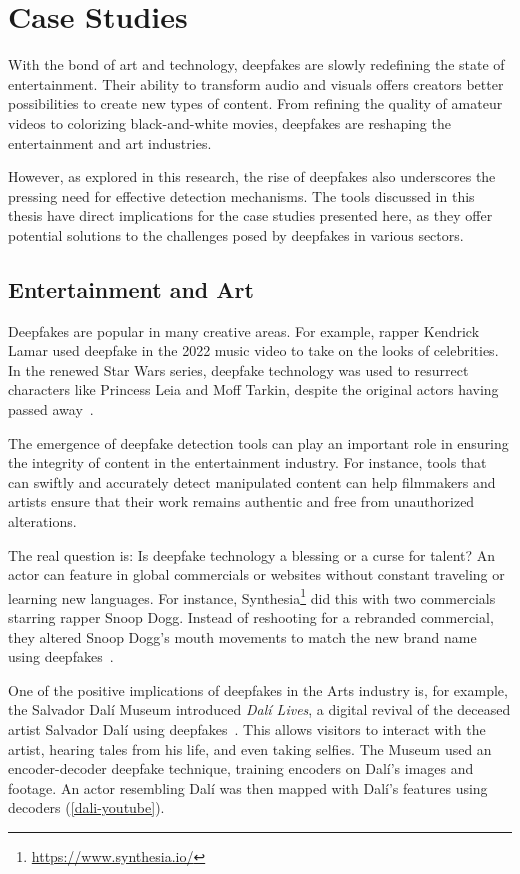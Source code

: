 
\chapter{Case Studies}\label{chapter:applications}
With the bond of art and technology, deepfakes are slowly redefining the state of
entertainment. Their ability to transform audio and visuals offers creators better
possibilities to create new types of content. From refining the quality of amateur
videos to colorizing black-and-white movies, deepfakes are reshaping the entertainment
and art industries.

However, as explored in this research, the rise of deepfakes also underscores the pressing
need for effective detection mechanisms. The tools discussed in this thesis have direct
implications for the case studies presented here, as they offer potential solutions
to the challenges posed by deepfakes in various sectors.


\section{Entertainment and Art}
Deepfakes are popular in many creative areas. For example, rapper Kendrick Lamar
used deepfake in the 2022 music video to take on the looks of celebrities. In the
renewed Star Wars series, deepfake technology was used to resurrect characters like
Princess Leia and Moff Tarkin, despite the original actors having passed away~\cite{motion-analysis}.

The emergence of deepfake detection tools can play an important role in ensuring the 
integrity of content in the entertainment industry. For instance, tools that can swiftly 
and accurately detect manipulated content can help filmmakers and artists ensure that 
their work remains authentic and free from unauthorized alterations.

The real question is: Is deepfake technology a blessing or a curse for talent?
An actor can feature in global commercials or websites
without constant traveling or learning new languages. For instance, Synthesia\footnote{\url{https://www.synthesia.io/}}
did this with two commercials starring rapper Snoop Dogg. Instead of reshooting for a
rebranded commercial, they altered Snoop Dogg's mouth movements to match the new brand
name using deepfakes~\cite{wipo-magazine}.

One of the positive implications of deepfakes in the Arts industry is, for example, the Salvador
Dalí Museum introduced \textit{Dalí Lives}, a digital revival of the deceased artist
Salvador Dalí using deepfakes~\cite{salvador-dali, salvador-dali2}.
This allows visitors to interact with the artist, hearing tales from his life, and
even taking selfies. The Museum used an encoder-decoder deepfake technique, training encoders on Dalí's
images and footage. An actor resembling Dalí was then mapped with Dalí's features using
decoders (\autoref{dali-youtube}).

